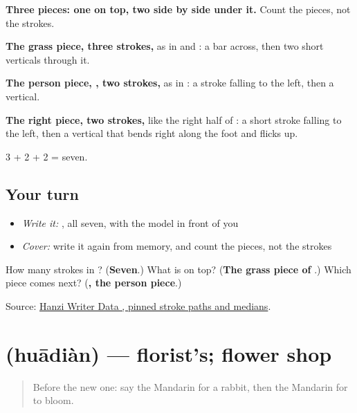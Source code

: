 \begin{quote}
\end{quote}

\textbf{Three pieces: one on top, two side by side under it.} Count the pieces, not the strokes.

\textbf{The grass piece, three strokes,} as in  and : a bar across, then two short verticals through it.

\textbf{The person piece, , two strokes,} as in : a stroke falling to the left, then a vertical.

\textbf{The right piece, two strokes,} like the right half of : a short stroke falling to the left, then a vertical that bends right along the foot and flicks up.

3 + 2 + 2 = seven.

\subsection*{Your turn}
\begin{itemize}
\raggedright
  \item \emph{Write it:} , all seven, with the model in front of you
  \item \emph{Cover:} write it again from memory, and count the pieces, not the strokes
\end{itemize}

\begin{tcolorbox}[breakable,colback=teal!4,colframe=teal!35!black,title={Before you move on}]
How many strokes in ? (\textbf{Seven}.) What is on top? (\textbf{The grass piece of }.) Which piece comes next? (\textbf{, the person piece}.)

Source: \href{https://raw.githubusercontent.com/chanind/hanzi-writer-data/68d10a4b21150cae5e1ebbd223eed289cf32d90c/data/\%E8\%8A\%B1.json}{Hanzi Writer Data , pinned stroke paths and medians}.
\end{tcolorbox}
\section[\texorpdfstring{\zh{花店} (huādiàn)}{花店 (huādiàn)}]{ (huādiàn) — florist's; flower shop}

\label{lesson:ZH-C224-huadian}



\begin{quote}
Before the new one: say the Mandarin for a rabbit, then the Mandarin for to bloom.
\end{quote}


